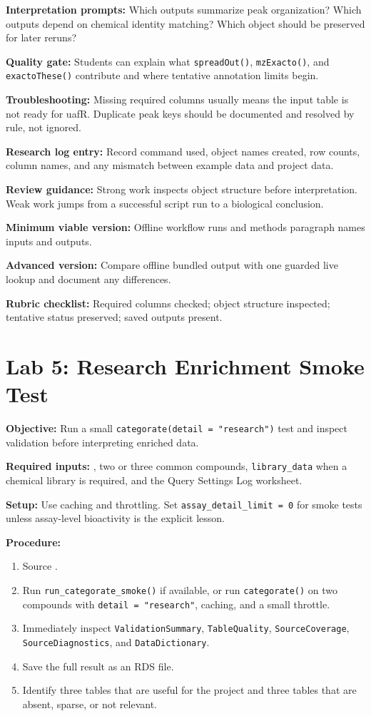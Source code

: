 \textbf{Interpretation prompts:} Which outputs summarize peak organization? Which outputs depend on chemical identity matching? Which object should be preserved for later reruns?

\textbf{Quality gate:} Students can explain what \texttt{spreadOut()}, \texttt{mzExacto()}, and \texttt{exactoThese()} contribute and where tentative annotation limits begin.

\textbf{Troubleshooting:} Missing required columns usually means the input table is not ready for uafR. Duplicate peak keys should be documented and resolved by rule, not ignored.

\textbf{Research log entry:} Record command used, object names created, row counts, column names, and any mismatch between example data and project data.

\textbf{Review guidance:} Strong work inspects object structure before interpretation. Weak work jumps from a successful script run to a biological conclusion.

\textbf{Minimum viable version:} Offline workflow runs and methods paragraph names inputs and outputs.

\textbf{Advanced version:} Compare offline bundled output with one guarded live lookup and document any differences.

\textbf{Rubric checklist:} Required columns checked; object structure inspected; tentative status preserved; saved outputs present.

\section{Lab 5: Research Enrichment Smoke Test}
\textbf{Objective:} Run a small \texttt{categorate(detail = "research")} test and inspect validation before interpreting enriched data.

\textbf{Required inputs:} , two or three common compounds, \texttt{library\_data} when a chemical library is required, and the Query Settings Log worksheet.

\textbf{Setup:} Use caching and throttling. Set \texttt{assay\_detail\_limit = 0} for smoke tests unless assay-level bioactivity is the explicit lesson.

\textbf{Procedure:}
\begin{enumerate}
  \item Source .
  \item Run \texttt{run\_categorate\_smoke()} if available, or run \texttt{categorate()} on two compounds with \texttt{detail = "research"}, caching, and a small throttle.
  \item Immediately inspect \texttt{ValidationSummary}, \texttt{TableQuality}, \texttt{SourceCoverage}, \texttt{SourceDiagnostics}, and \texttt{DataDictionary}.
  \item Save the full result as an RDS file.
  \item Identify three tables that are useful for the project and three tables that are absent, sparse, or not relevant.
\end{enumerate}

